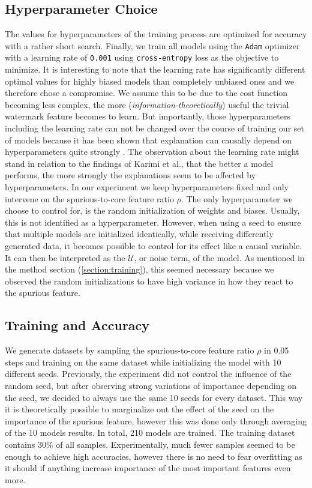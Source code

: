 \subsection{Hyperparameter Choice}
The values for hyperparameters of the training process are optimized for accuracy with a rather short search. Finally, we train all models using the \verb|Adam| optimizer with a learning rate of \verb|0.001| using \verb|cross-entropy| loss as the objective to minimize. 
It is interesting to note that the learning rate has significantly different optimal values for highly biased models than completely unbiased ones and we therefore chose a compromise. We assume this to be due to the cost function becoming less complex, the more (\textit{information-theoretically}) useful the trivial watermark feature becomes to learn.
But importantly, those hyperparameters including the learning rate can not be changed over the course of training our set of models because it has been shown that explanation can causally depend on hyperparameters quite strongly \cite{Karimi2023}. The observation about the learning rate might stand in relation to the findings of Karimi et al., that the better a model performs, the more strongly the explanations seem to be affected by hyperparameters.
In our experiment we keep hyperparameters fixed and only intervene on the spurious-to-core feature ratio $\rho$. The only hyperparameter we choose to control for, is the random initialization of weights and biases. Usually, this is not identified as a hyperparameter. However, when using a seed to ensure that multiple models are initialized identically, while receiving differently generated data, it becomes possible to control for its effect like a causal variable. It can then be interpreted as the $\mathcal{U}$, or noise term, of the model.
As mentioned in the method section (\ref{section:training}), this seemed necessary because we observed the random initializations to have high variance in how they react to the spurious feature. 

\subsection{Training and Accuracy}
We generate datasets by sampling the spurious-to-core feature ratio $\rho$ in 0.05 steps and training on the same dataset while initializing the model with 10 different seeds.
Previously, the experiment did not control the influence of the random seed, but after observing strong variations of importance depending on the seed, we decided to always use the same 10 seeds for every dataset. This way it is theoretically possible to marginalize out the effect of the seed on the importance of the spurious feature, however this was done only through averaging of the 10 models results.
In total, 210 models are trained. The training dataset contains 30\% of all samples. Experimentally, much fewer samples seemed to be enough to achieve high accuracies, however there is no need to fear overfitting as it should if anything increase importance of the most important features even more.

